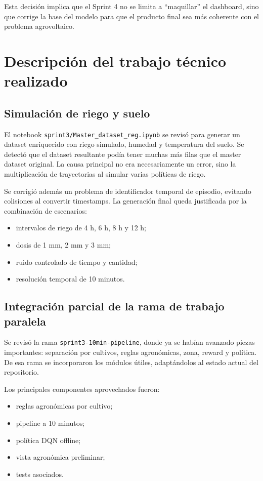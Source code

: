 \documentclass[11pt,a4paper]{article}
\begin{document}
Esta decisión implica que el Sprint 4 no se limita a ``maquillar'' el dashboard, sino que corrige la base del modelo para que el producto final sea más coherente con el problema agrovoltaico.

\newpage

\section{Descripción del trabajo técnico realizado}

\subsection{Simulación de riego y suelo}

El notebook \texttt{sprint3/Master\_dataset\_reg.ipynb} se revisó para generar un dataset enriquecido con riego simulado, humedad y temperatura del suelo. Se detectó que el dataset resultante podía tener muchas más filas que el master dataset original. La causa principal no era necesariamente un error, sino la multiplicación de trayectorias al simular varias políticas de riego.

Se corrigió además un problema de identificador temporal de episodio, evitando colisiones al convertir timestamps. La generación final queda justificada por la combinación de escenarios:

\begin{itemize}
    \item intervalos de riego de 4 h, 6 h, 8 h y 12 h;
    \item dosis de 1 mm, 2 mm y 3 mm;
    \item ruido controlado de tiempo y cantidad;
    \item resolución temporal de 10 minutos.
\end{itemize}

\subsection{Integración parcial de la rama de trabajo paralela}

Se revisó la rama \texttt{sprint3-10min-pipeline}, donde ya se habían avanzado piezas importantes: separación por cultivos, reglas agronómicas, zona, reward y política. De esa rama se incorporaron los módulos útiles, adaptándolos al estado actual del repositorio.

Los principales componentes aprovechados fueron:

\begin{itemize}
    \item reglas agronómicas por cultivo;
    \item pipeline a 10 minutos;
    \item política DQN offline;
    \item vista agronómica preliminar;
    \item tests asociados.
\end{itemize}
\end{document}
